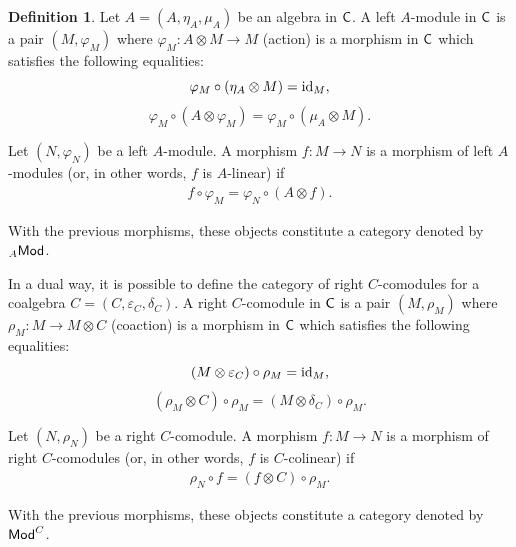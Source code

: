 \documentclass[11pt,reqno]{amsart}
\theoremstyle{plain}%
\theoremstyle{definition}
\newtheorem{definition}[theorem]{Definition}%
\theoremstyle{remark}
\begin{document}
\begin{definition}
Let $A=(A,\eta_{A},\mu_{A})$ be an algebra in ${\sf C}$. A left $A$-module in ${\sf C}$ is a pair $(M,\varphi_{M})$ where $\varphi_{M}\colon A\otimes M\rightarrow M$ (action) is a morphism in ${\sf C}$ which satisfies the following equalities:
\begin{equation}\label{actioneta}
\varphi_{M}\circ(\eta_{A}\otimes M)={\rm id}_{M},
\end{equation}
\begin{equation}
\label{actionprod}
\varphi_{M}\circ(A\otimes\varphi_{M})=\varphi_{M}\circ(\mu_{A}\otimes M).
\end{equation}

Let $(N,\varphi_{N})$ be a left $A$-module. A morphism $f\colon M\rightarrow N$ is a morphism of left $A$-modules (or, in other words, $f$ is $A$-linear) if 
\begin{gather}\label{mod_mor}
	f\circ\varphi_{M}=\varphi_{N}\circ(A\otimes f).
\end{gather}

With the previous morphisms, these objects constitute a category denoted by ${}_{A}{\sf Mod}$.


In a dual way, it is possible to define the category of right $C$-comodules for a coalgebra $C=(C,\varepsilon_{C},\delta_{C})$. A right $C$-comodule in ${\sf C}$ is a pair  $(M,\rho_{M})$ where $\rho_{M}\colon M\rightarrow M\otimes C$ (coaction) is a morphism in ${\sf C}$ which satisfies the following equalities:
\begin{equation*}\label{coactionvar}
(M\otimes \varepsilon_{C})\circ \rho_{M}={\rm id}_{M},
\end{equation*}
\begin{equation*}
\label{coactioncoprod}
(\rho_{M}\otimes C)\circ \rho_{M}=(M\otimes \delta_{C})\circ \rho_{M}.
\end{equation*}

Let $(N,\rho_{N})$ be a right $C$-comodule. A morphism $f\colon M\rightarrow N$ is a morphism of right  $C$-comodules (or, in other words, $f$ is $C$-colinear) if 
\begin{gather*}\label{comod_mor}
\rho_{N}\circ f=(f\otimes C)\circ \rho_{M}.
\end{gather*}

With the previous morphisms, these objects constitute a category denoted by ${\sf Mod}^C$.
\end{definition}
\end{document}
